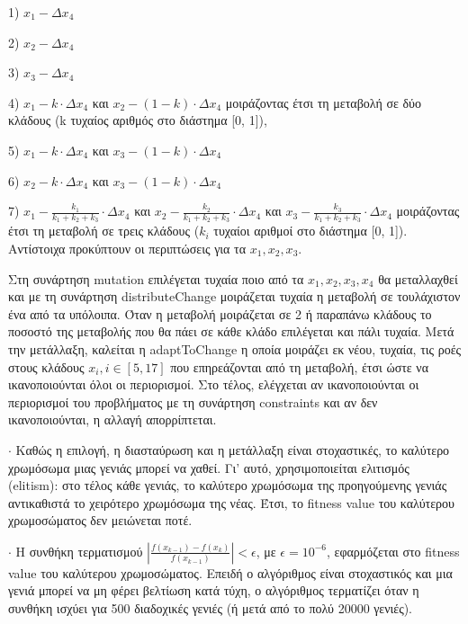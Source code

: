 \documentclass[11pt,a4paper,onecolumn,final]{article}
\begin{document}
{{{\begin{flushleft}
1) \(x_{1}-\Delta x_{4}\) 

2) \(x_{2}-\Delta x_{4}\) 

3) \(x_{3}-\Delta x_{4}\) 

4) \(x_{1}-k \cdot \Delta x_{4}\) και \(x_{2}-(1-k) \cdot \Delta x_{4}\) μοιράζοντας έτσι τη μεταβολή σε δύο κλάδους (k τυχαίος αριθμός στο διάστημα [0, 1]),  

5) \(x_{1}-k \cdot \Delta x_{4}\) και \(x_{3}-(1-k) \cdot \Delta x_{4}\) 

6) \(x_{2}-k \cdot \Delta x_{4}\) και \(x_{3}-(1-k) \cdot \Delta x_{4}\)  

7) \(x_{1}-\frac{k_{1}}{k_{1}+k_{2}+k_{3}} \cdot \Delta x_{4}\) και \(x_{2}-\frac{k_{2}}{k_{1}+k_{2}+k_{3}} \cdot \Delta x_{4}\) και \(x_{3}-\frac{k_{3}}{k_{1}+k_{2}+k_{3}} \cdot \Delta x_{4}\) μοιράζοντας έτσι τη μεταβολή σε τρεις κλάδους (\(k_{i}\) τυχαίοι αριθμοί στο διάστημα [0, 1]). Αντίστοιχα προκύπτουν οι περιπτώσεις για τα \(x_{1}, x_{2}, x_{3}\).

Στη συνάρτηση mutation επιλέγεται τυχαία ποιο από τα \(x_{1}, x_{2}, x_{3}, x_{4}\) θα μεταλλαχθεί και με τη συνάρτηση distributeChange μοιράζεται τυχαία η μεταβολή σε τουλάχιστον ένα από τα υπόλοιπα. Όταν η μεταβολή μοιράζεται σε 2 ή παραπάνω κλάδους το ποσοστό της μεταβολής που θα πάει σε κάθε κλάδο επιλέγεται και πάλι τυχαία. Μετά την μετάλλαξη, καλείται η adaptToChange η οποία μοιράζει εκ νέου, τυχαία, τις ροές στους κλάδους \(x_{i}, i \in [5, 17]\) που επηρεάζονται από τη μεταβολή, έτσι ώστε να ικανοποιούνται όλοι οι περιορισμοί. Στο τέλος, ελέγχεται αν ικανοποιούνται οι περιορισμοί του προβλήματος με τη συνάρτηση constraints και αν δεν ικανοποιούνται, η αλλαγή απορρίπτεται.

\vspace{0.4cm}

\(\cdot\) Καθώς η επιλογή, η διασταύρωση και η μετάλλαξη είναι στοχαστικές, το καλύτερο χρωμόσωμα μιας γενιάς μπορεί να χαθεί. Γι' αυτό, χρησιμοποιείται ελιτισμός (elitism): στο τέλος κάθε γενιάς, το καλύτερο χρωμόσωμα της προηγούμενης γενιάς αντικαθιστά το χειρότερο χρωμόσωμα της νέας. Έτσι, το fitness value του καλύτερου χρωμοσώματος δεν μειώνεται ποτέ.

\vspace{0.4cm}

\(\cdot\) Η συνθήκη τερματισμού \(|\frac{f(x_{k-1})-f(x_{k})}{f(x_{k-1})}|<\epsilon\), με \(\epsilon=10^{-6}\), εφαρμόζεται στο fitness value του καλύτερου χρωμοσώματος. Επειδή ο αλγόριθμος είναι στοχαστικός και μια γενιά μπορεί να μη φέρει βελτίωση κατά τύχη, ο αλγόριθμος τερματίζει όταν η συνθήκη ισχύει για 500 διαδοχικές γενιές (ή μετά από το πολύ 20000 γενιές).


\end{flushleft}}}}
\end{document}
